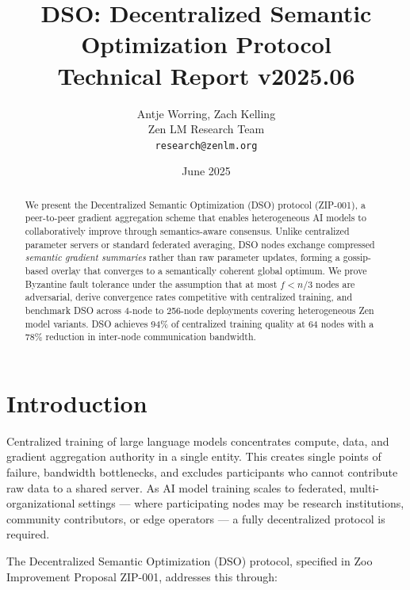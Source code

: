 \documentclass[11pt,a4paper]{article}
\title{\textbf{DSO: Decentralized Semantic Optimization Protocol}\\
\large Technical Report v2025.06}
\author{Antje Worring, Zach Kelling \\ Zen LM Research Team\\
\texttt{research@zenlm.org}}
\date{June 2025}
\begin{document}
\maketitle

\begin{abstract}
We present the Decentralized Semantic Optimization (DSO) protocol (ZIP-001), a
peer-to-peer gradient aggregation scheme that enables heterogeneous AI models to
collaboratively improve through semantics-aware consensus. Unlike centralized
parameter servers or standard federated averaging, DSO nodes exchange compressed
\emph{semantic gradient summaries} rather than raw parameter updates, forming a
gossip-based overlay that converges to a semantically coherent global optimum.
We prove Byzantine fault tolerance under the assumption that at most $f < n/3$
nodes are adversarial, derive convergence rates competitive with centralized
training, and benchmark DSO across 4-node to 256-node deployments covering
heterogeneous Zen model variants. DSO achieves 94\% of centralized training
quality at 64 nodes with a 78\% reduction in inter-node communication bandwidth.
\end{abstract}

\tableofcontents
\newpage

\section{Introduction}
\label{sec:intro}

Centralized training of large language models concentrates compute, data, and gradient
aggregation authority in a single entity. This creates single points of failure,
bandwidth bottlenecks, and excludes participants who cannot contribute raw data to a
shared server. As AI model training scales to federated, multi-organizational settings —
where participating nodes may be research institutions, community contributors, or
edge operators — a fully decentralized protocol is required.

The Decentralized Semantic Optimization (DSO) protocol, specified in Zoo Improvement
Proposal ZIP-001, addresses this through:
\end{document}
